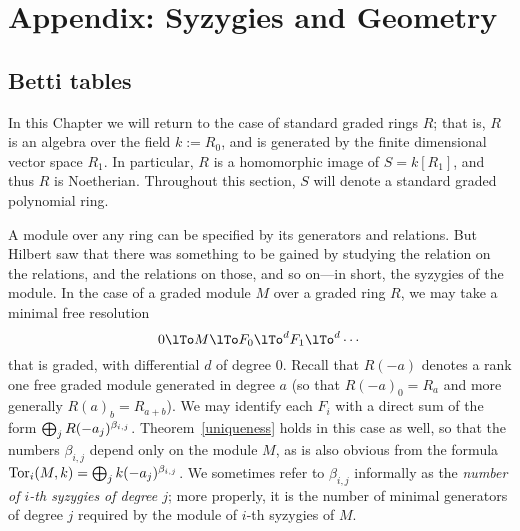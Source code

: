 
\chapter{Appendix: Syzygies and Geometry}\label{syzygy chapter}

\section{Betti tables}


 In this Chapter we will return to the case of standard graded rings $R$; that is, $R$ is an algebra over the field $k := R_0$, and is generated by the finite dimensional vector space $R_1$. In particular, $R$ is a homomorphic image of 
$S = k[R_1]$, and thus $R$ is Noetherian. Throughout this section, $S$ will denote a standard graded polynomial ring.

A module over any ring can be specified by its generators and relations. But Hilbert saw that there was something to be gained by studying the relation on the relations, and the relations on those, and so on---in short, the syzygies of the module.
In the case of a graded module $M$ over a graded ring $R$, we may take a minimal free resolution
$$
0\lTo M \lTo F_0 \lTo^d F_1\lTo^d\cdots
$$
that is graded, with differential $d$ of degree 0. Recall that $R(-a)$ denotes a rank one free graded module generated in degree $a$ (so that $R(-a)_0 = R_a$ and more generally $R(a)_{b} = R_{a+b}$). We may identify each $F_i$ with a direct sum of the form 
$\bigoplus_j R(-a_j)^{\beta_{i,j}}$. 
Theorem~\ref{uniqueness} holds in this case as well, so that 
the numbers $\beta_{i,j}$ depend only on the module $M$, as is also obvious from the formula $\operatorname{Tor}_i(M,k) = \bigoplus_j k(-a_j)^{\beta_{i,j}}$.
We sometimes refer to $\beta_{i,j}$ informally as the \emph{number of $i$-th syzygies of degree $j$}; more properly, it is the number of minimal generators of degree $j$ required by the module of $i$-th syzygies of $M$.

